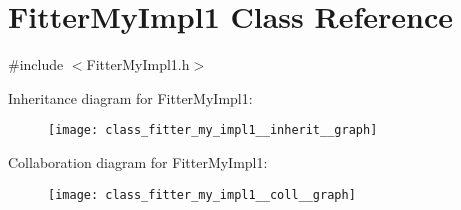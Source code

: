 \hypertarget{class_fitter_my_impl1}{\section{Fitter\-My\-Impl1 Class Reference}
\label{class_fitter_my_impl1}
}


{\ttfamily \#include $<$Fitter\-My\-Impl1.\-h$>$}



Inheritance diagram for Fitter\-My\-Impl1\-:\nopagebreak
\begin{figure}[H]
\begin{center}
\leavevmode
\texttt{[image: class\_fitter\_my\_impl1\_\_inherit\_\_graph]}
\end{center}
\end{figure}


Collaboration diagram for Fitter\-My\-Impl1\-:\nopagebreak
\begin{figure}[H]
\begin{center}
\leavevmode
\texttt{[image: class\_fitter\_my\_impl1\_\_coll\_\_graph]}
\end{center}
\end{figure}
